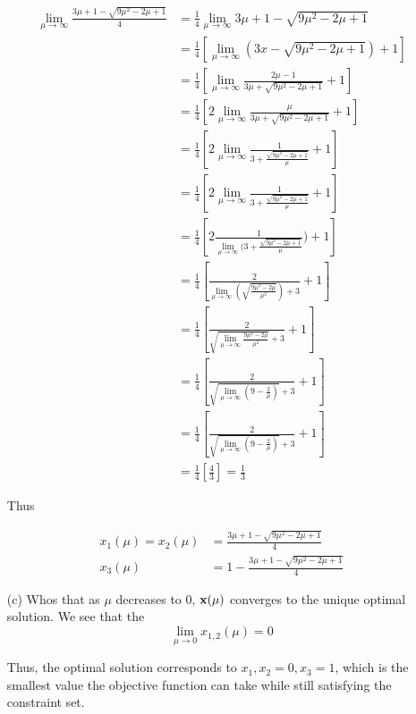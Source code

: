 \documentclass{article} %
\newcommand\x{{\bf x}}
\begin{document}
\begin{itemize}
\begin{equation*}
\begin{aligned}
\lim_{\mu \to \infty} \frac{3 \mu + 1 -  \sqrt{9\mu^2 -2  \mu + 1}} { 4} &= \frac{1}{4}\lim_{\mu \to \infty} 3 \mu + 1 -  \sqrt{9\mu^2 -2  \mu + 1} \\ 
&= \frac{1}{4}[ \lim_{\mu \to \infty} (3x -  \sqrt{9\mu^2 -2  \mu + 1}) + 1] \\ 
&= \frac{1}{4}[\lim_{\mu \to \infty} \frac{2 \mu -1}{3 \mu   +  \sqrt{9\mu^2 -2  \mu + 1}} + 1] \\ 
&= \frac{1}{4}[ 2 \lim_{\mu \to \infty} \frac{\mu}{3 \mu   +  \sqrt{9\mu^2 -2  \mu + 1}} + 1] \\ 
&= \frac{1}{4}[ 2 \lim_{\mu \to \infty} \frac{1}{3    +  \frac{\sqrt{9\mu^2 -2  \mu + 1}}{\mu}} + 1] \\ 
&= \frac{1}{4}[ 2 \lim_{\mu \to \infty} \frac{1}{3    +  \frac{\sqrt{9\mu^2 -2  \mu + 1}}{\mu}} + 1] \\ 
&= \frac{1}{4}[ 2  \frac{1}{ \lim_{\mu \to \infty} (3    +  \frac{\sqrt{9\mu^2 -2  \mu + 1}}{\mu}}) + 1] \\ 
&= \frac{1}{4}[   \frac{2}{ \lim_{\mu \to \infty} ( \sqrt{ \frac{9\mu^2 -2  \mu}{\mu^2}}) + 3} + 1] \\ 
&= \frac{1}{4}[   \frac{2}{ \sqrt{\lim_{\mu \to \infty}  \frac{9\mu^2 -2  \mu}{\mu^2}}  + 3}  + 1] \\ 
&= \frac{1}{4}[   \frac{2}{ \sqrt{\lim_{\mu \to \infty} (9 - \frac{2}{\mu})}  + 3}  + 1] \\ 
&= \frac{1}{4}[   \frac{2}{ \sqrt{\lim_{\mu \to \infty} (9 - \frac{2}{\mu})}  + 3}  + 1] \\ 
&= \frac{1}{4}[   \frac{4}{3}]  = \frac{1}{3}
\end{aligned}
\end{equation*}

Thus 

\begin{equation*}
\begin{aligned}
x_1(\mu) = x_2(\mu) &= \frac{3 \mu + 1 -  \sqrt{9\mu^2 -2  \mu + 1}} { 4} \\ 
x_3 (\mu) &= 1 - \frac{3 \mu + 1 -  \sqrt{9\mu^2 -2  \mu + 1}} { 4}
\end{aligned}
\end{equation*}
\item[(c)] Whos that as $\mu$ decreases to $0$, $ \x(\mu)$ converges to the unique optimal solution. 
We see that the 
\[
\lim_{\mu \to 0} x_{1,2}(\mu) = 0
\]

Thus, the optimal solution corresponds to $x_1, x_2 = 0, x_3 = 1$, which is the smallest value the objective function can take while
still satisfying the constraint set. 




\end{itemize}
\end{document}
